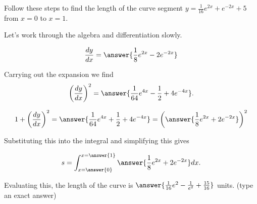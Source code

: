 \documentclass{ximera}
\author{Jim Talamo}
\begin{document}
\begin{exercise}

Follow these steps to find the length of the curve segment $y=\frac{1}{16}e^{2x}+e^{-2x}+5$ from $x=0$ to $x=1$.

Let's work through the algebra and differentiation slowly.

\[
\frac{dy}{dx} = \answer{\frac{1}{8}e^{2x}-2e^{-2x}}
\]

Carrying out the expansion we find
\[
\left(\frac{dy}{dx}\right)^2 = \answer{\frac{1}{64}e^{4x}-\frac{1}{2}+4e^{-4x}}.
\]

\begin{exercise}

\[
1+ \left(\frac{dy}{dx}\right)^2 = \answer{\frac{1}{64}e^{4x}+\frac{1}{2}+4e^{-4x}} = \left(\answer{\frac{1}{8}e^{2x}+2e^{-2x} }  \right)^2
\]

\begin{exercise}
Substituting this into the integral and simplifying this gives

\[
s= \int_{x=\answer{0}}^{x=\answer{1}} \answer{\frac{1}{8}e^{2x}+2e^{-2x}} dx .
\]

Evaluating this, the length of the curve is $\answer{\frac{1}{16}e^2-\frac{1}{e^2} +\frac{15}{16} }$ units. (type an exact answer)


\end{exercise}
\end{exercise}
\end{exercise}
\end{document}
